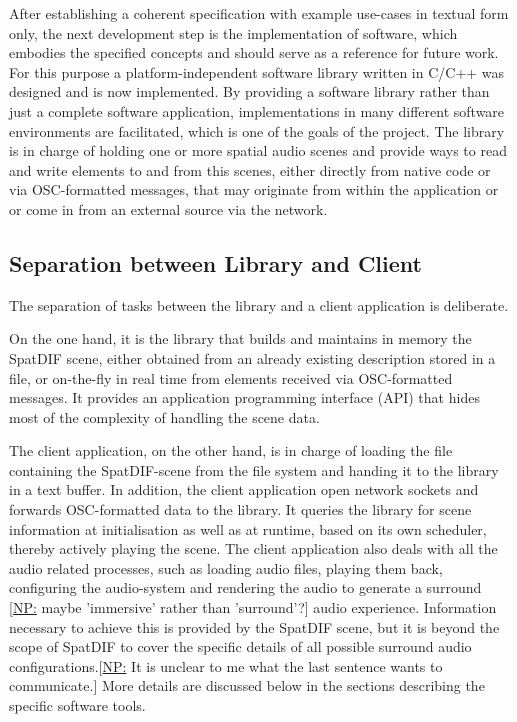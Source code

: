 \documentclass{article}
\newcommand{\np}[1]{\noindent\textcolor{carrotorange}{[\underline{NP:} #1]}}
\begin{document}
After establishing a coherent specification with example use-cases in textual form only, the next development step is the implementation of software, which embodies the specified concepts and should serve as a reference for future work.
For this purpose a platform-independent software library written in C/C++ was designed and is now implemented. \cite{Miyama_2013}
By providing a software library rather than just a complete software application, implementations in many different software environments are facilitated, which is one of the goals of the project.
The library is in charge of holding one or more spatial audio scenes and provide ways to read and write elements to and from this scenes, either directly from native code or via OSC-formatted messages, that may originate from within the application or or come in from an external source via the network.

\subsection{Separation between Library and Client}\label{subsec:separation}

The separation of tasks between the library and a client application is deliberate.

On the one hand, it is the library that builds and maintains in memory the SpatDIF scene, either obtained from an already existing description stored in a file, or on-the-fly in real time from elements received via OSC-formatted messages.
It provides an application programming interface (API) that hides most of the complexity of handling the scene data.

The client application, on the other hand, is in charge of loading the file containing the SpatDIF-scene from the file system and handing it to the library in a text buffer.
In addition, the client application open network sockets and forwards OSC-formatted data to the library.
It queries the library for scene information at initialisation as well as at runtime, based on its own scheduler, thereby actively playing the scene.
The client application also deals with all the audio related processes, such as loading audio files, playing them back, configuring the audio-system and rendering the audio to generate a surround \np{maybe 'immersive' rather than 'surround'?} audio experience.
Information necessary to achieve this is provided by the SpatDIF scene, but it is beyond the scope of SpatDIF to cover the specific details of all possible surround audio configurations.\np{It is unclear to me what the last sentence wants to communicate.}
More details are discussed below in the sections describing the specific software tools.
\end{document}
